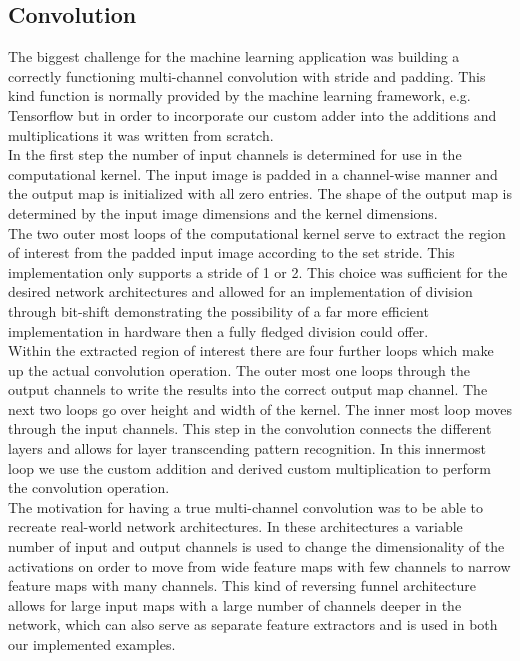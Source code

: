 \documentclass[]{IEEEtran}
\begin{document}
\subsection{Convolution}
The biggest challenge for the machine learning application was building a correctly functioning multi-channel convolution with stride and padding. This kind function is normally provided by the machine learning framework, e.g. Tensorflow but in order to incorporate our custom adder into the additions and multiplications it was written from scratch. \\
In the first step the number of input channels is determined for use in the computational kernel. The input image is padded in a channel-wise manner and the output map is initialized with all zero entries. The shape of the output map is determined by the input image dimensions and the kernel dimensions. \\
The two outer most loops of the computational kernel serve to extract the region of interest from the padded input image according to the set stride. This implementation only supports a stride of 1 or 2. This choice was sufficient for the desired network architectures and allowed for an implementation of division through bit-shift demonstrating the possibility of a  far more efficient implementation in hardware then a fully fledged division could offer. \\
Within the extracted region of interest there are four further loops which make up the actual convolution operation. The outer most one loops through the output channels to write the results into the correct output map channel. The next two loops go over height and width of the kernel. The inner most loop moves through the input channels. This step in the convolution connects the different layers and allows for layer transcending pattern recognition. In this innermost loop we use the custom addition and derived custom multiplication to perform the convolution operation.\\
The motivation for having a true multi-channel convolution was to be able to recreate real-world network architectures. In these architectures a variable number of input and output channels is used to change the dimensionality of the activations on order to move from wide feature maps with few channels to narrow feature maps with many channels. This kind of reversing funnel architecture allows for large input maps with a large number of channels deeper in the network, which can also serve as separate feature extractors and is used in both our implemented examples. 
\end{document}

